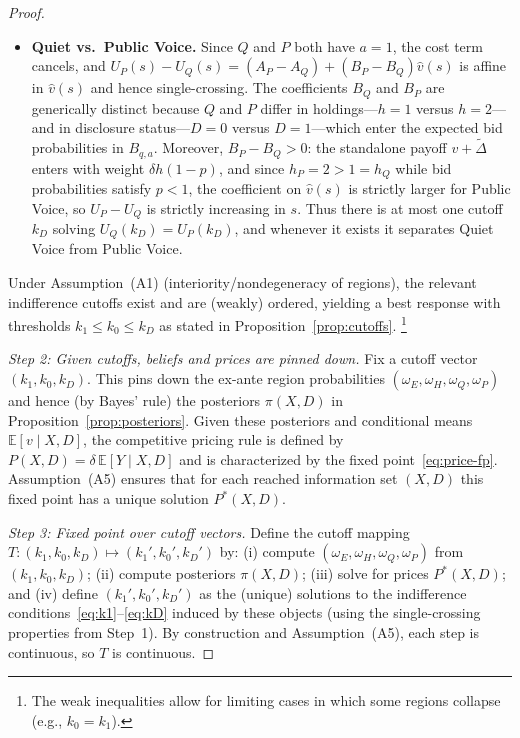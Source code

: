 \documentclass[11pt]{article}
\newcommand{\E}{\mathbb{E}}
\newcommand{\1}{\mathbf{1}}
\begin{document}
\begin{proof}
\begin{itemize}[leftmargin=1.5em,itemsep=2pt]
\begin{equation}
\label{eq:UH-UQ}
\end{equation}
which is weakly increasing in $s$ (strictly increasing when $\chi>0$). Thus there is at most one cutoff $k_0$ solving $U_H(k_0)=U_Q(k_0)$, and whenever it exists it separates Passive Hold from Quiet Voice.
\item \textbf{Quiet vs.\ Public Voice.} Since $Q$ and $P$ both have $a=1$, the cost term cancels, and $U_P(s)-U_Q(s)=(A_P-A_Q)+(B_P-B_Q)\hat v(s)$ is affine in $\hat v(s)$ and hence single-crossing. The coefficients $B_Q$ and $B_P$ are generically distinct because $Q$ and $P$ differ in holdings---$h=1$ versus $h=2$---and in disclosure status---$D=0$ versus $D=1$---which enter the expected bid probabilities in $B_{q,a}$. Moreover, $B_P-B_Q>0$: the standalone payoff $v+\tilde{\Delta}$ enters with weight $\delta h(1-p)$, and since $h_P=2>1=h_Q$ while bid probabilities satisfy $p<1$, the coefficient on $\hat v(s)$ is strictly larger for Public Voice, so $U_P-U_Q$ is strictly increasing in $s$. Thus there is at most one cutoff $k_D$ solving $U_Q(k_D)=U_P(k_D)$, and whenever it exists it separates Quiet Voice from Public Voice.
\end{itemize}
Under Assumption~\textup{(A1)} (interiority/nondegeneracy of regions), the relevant indifference cutoffs exist and are (weakly) ordered, yielding a best response with thresholds $k_1\le k_0\le k_D$ as stated in Proposition~\ref{prop:cutoffs}.%
\footnote{The weak inequalities allow for limiting cases in which some regions collapse (e.g., $k_0=k_1$).}

\textit{Step 2: Given cutoffs, beliefs and prices are pinned down.}
Fix a cutoff vector $(k_1,k_0,k_D)$. This pins down the ex-ante region probabilities $(\omega_E,\omega_H,\omega_Q,\omega_P)$ and hence (by Bayes' rule) the posteriors $\pi(X,D)$ in Proposition~\ref{prop:posteriors}. Given these posteriors and conditional means $\E[v \mid X,D]$, the competitive pricing rule is defined by $P(X,D)=\delta\,\E[Y \mid X,D]$ and is characterized by the fixed point~\eqref{eq:price-fp}. Assumption~\textup{(A5)} ensures that for each reached information set $(X,D)$ this fixed point has a unique solution $P^*(X,D)$.

\textit{Step 3: Fixed point over cutoff vectors.}
Define the cutoff mapping $T:(k_1,k_0,k_D)\mapsto(k_1',k_0',k_D')$ by: (i) compute $(\omega_E,\omega_H,\omega_Q,\omega_P)$ from $(k_1,k_0,k_D)$; (ii) compute posteriors $\pi(X,D)$; (iii) solve for prices $P^*(X,D)$; and (iv) define $(k_1',k_0',k_D')$ as the (unique) solutions to the indifference conditions~\eqref{eq:k1}--\eqref{eq:kD} induced by these objects (using the single-crossing properties from Step~1). By construction and Assumption~\textup{(A5)}, each step is continuous, so $T$ is continuous.


\end{proof}
\end{document}
